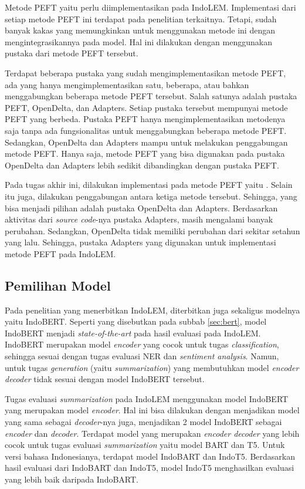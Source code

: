 Metode PEFT yaitu \methodPEFT perlu diimplementasikan pada IndoLEM. Implementasi dari setiap metode PEFT ini terdapat pada penelitian terkaitnya. Tetapi, sudah banyak kakas yang memungkinkan untuk menggunakan metode ini dengan mengintegrasikannya pada model. Hal ini dilakukan dengan menggunakan pustaka dari metode PEFT tersebut.

Terdapat beberapa pustaka yang sudah mengimplementasikan metode PEFT, ada yang hanya mengimplementasikan satu, beberapa, atau bahkan menggabungkan beberapa metode PEFT tersebut. Salah satunya adalah pustaka PEFT, OpenDelta, dan Adapters. Setiap pustaka tersebut mempunyai metode PEFT yang berbeda. Pustaka PEFT hanya mengimplementasikan metodenya saja tanpa ada fungsionalitas untuk menggabungkan beberapa metode PEFT. Sedangkan, OpenDelta dan Adapters mampu untuk melakukan penggabungan metode PEFT. Hanya saja, metode PEFT yang bisa digunakan pada pustaka OpenDelta dan Adapters lebih sedikit dibandingkan dengan pustaka PEFT.

Pada tugas akhir ini,  dilakukan implementasi pada metode PEFT yaitu \methodPEFT. Selain itu juga, dilakukan penggabungan antara ketiga metode tersebut. Sehingga, yang bisa menjadi pilihan adalah pustaka OpenDelta dan Adapters. Berdasarkan aktivitas dari \textit{source code}-nya pustaka Adapters, masih mengalami banyak perubahan. Sedangkan, OpenDelta tidak memiliki perubahan dari sekitar setahun yang lalu. Sehingga, pustaka Adapters yang  digunakan untuk implementasi metode PEFT pada IndoLEM.

\subsection{Pemilihan Model}

Pada penelitian yang menerbitkan IndoLEM, diterbitkan juga sekaligus modelnya yaitu IndoBERT. Seperti yang disebutkan pada subbab \ref{sec:bert}, model IndoBERT menjadi \textit{state-of-the-art} pada hasil evaluasi pada IndoLEM. IndoBERT merupakan model \textit{encoder} yang cocok untuk tugas \textit{classification}, sehingga sesuai dengan tugas evaluasi NER dan \textit{sentiment analysis}. Namun, untuk tugas \textit{generation} (yaitu \textit{summarization}) yang membutuhkan model \textit{encoder decoder} tidak sesuai dengan model IndoBERT tersebut.

Tugas evaluasi \textit{summarization} pada IndoLEM menggunakan model IndoBERT yang merupakan model \textit{encoder}. Hal ini bisa dilakukan dengan menjadikan model yang sama sebagai \textit{decoder}-nya juga, menjadikan 2 model IndoBERT sebagai \textit{encoder} dan \textit{decoder}. Terdapat model yang merupakan \textit{encoder decoder} yang lebih cocok untuk tugas evaluasi \textit{summarization} yaitu model BART dan T5. Untuk versi bahasa Indonesianya, terdapat model IndoBART dan IndoT5. Berdasarkan hasil evaluasi dari IndoBART dan IndoT5, model IndoT5 menghasilkan evaluasi yang lebih baik daripada IndoBART. 

